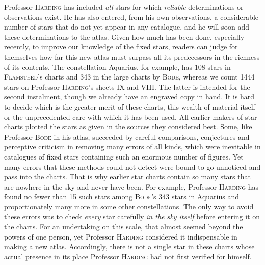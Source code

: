Professor \textsc{Harding} has included \emph{all} stars for which \emph{reliable} determinations or observations exist. He has also entered, from his own observations, a considerable number of stars that do not yet appear in any catalogue, and he will soon add these determinations to the atlas. Given how much has been done, especially recently, to improve our knowledge of the fixed stars, readers can judge for themselves how far this new atlas must surpass all its predecessors in the richness of its contents. The constellation Aquarius, for example, has 108 stars in \textsc{Flamsteed}’s charts and 343 in the large charts by \textsc{Bode}, whereas we count 1444 stars on Professor \textsc{Harding}’s sheets IX and VIII. The latter is intended for the second instalment, though we already have an engraved copy in hand. It is hard to decide which is the greater merit of these charts, this wealth of material itself or the unprecedented care with which it has been used. All earlier makers of star charts plotted the stars as given in the sources they considered best. Some, like Professor \textsc{Bode} in his atlas, succeeded by careful comparisons, conjectures and perceptive criticism in removing many errors of all kinds, which were inevitable in catalogues of fixed stars containing such an enormous number of figures. Yet many errors that these methods could not detect were bound to go unnoticed and pass into the charts. That is why earlier star charts contain so many stars that are nowhere in the sky and never have been. For example, Professor \textsc{Harding} has found no fewer than 15 such stars among \textsc{Bode}’s 343 stars in Aquarius and proportionately many more in some other constellations. The only way to avoid these errors was to check \emph{every} star carefully \emph{in the sky itself} before entering it on the charts. For an undertaking on this scale, that almost seemed beyond the powers of one person, yet Professor \textsc{Harding} considered it indispensable in making a new atlas. Accordingly, there is not a single star in these charts whose actual presence in its place Professor \textsc{Harding} had not first verified for himself.

